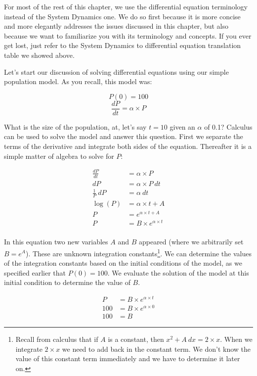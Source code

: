 \documentclass[]{memoir}
\begin{document}
For most of the rest of this chapter, we use the differential equation
terminology instead of the System Dynamics one. We do so first because
it is more concise and more elegantly addresses the issues discussed in
this chapter, but also because we want to familiarize you with its
terminology and concepts. If you ever get lost, just refer to the System
Dynamics to differential equation translation table we showed above.

Let's start our discussion of solving differential equations using our
simple population model. As you recall, this model was:

\[ P(0) = 100 \] \[ \frac{dP}{dt} = \alpha \times P \]

What is the size of the population, at, let's say $t=10$ given an
$\alpha$ of 0.1? Calculus can be used to solve the model and answer this
question. First we separate the terms of the derivative and integrate
both sides of the equation. Thereafter it is a simple matter of algebra
to solve for $P$:

\[
\begin{aligned}
\frac{dP}{dt} &= \alpha \times P \\
dP &= \alpha \times P\ dt \\
\frac{1}{P}\ dP &= \alpha\ dt \\
\log(P) &= \alpha \times t + A \\
P &=  e^{\alpha \times t + A} \\
P &=  B \times e^{\alpha \times t} \\
\end{aligned}
\]

In this equation two new variables $A$ and $B$ appeared (where we
arbitrarily set $B=e^A$). These are unknown integration
constants\footnote{Recall from calculus that if $A$ is a constant, then
  $x^2+A\ dx = 2 \times x$. When we integrate $2 \times x$ we need to
  add back in the constant term. We don't know the value of this
  constant term immediately and we have to determine it later on.}. We
can determine the values of the integration constants based on the
initial conditions of the model, as we specified earlier that
$P(0) = 100$. We evaluate the solution of the model at this initial
condition to determine the value of $B$.

\[
\begin{aligned}
P &= B \times e^{\alpha \times t} \\
100 &= B \times e^{\alpha \times 0} \\
100 &= B
\end{aligned}
\]
\end{document}
